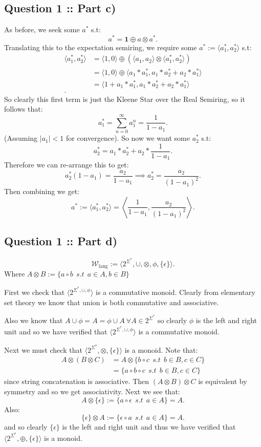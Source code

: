 \documentclass[a4paper]{article}
\begin{document}
\subsection*{Question 1 :: Part c)}
As before, we seek some $a^*$ s.t:
\[
a^* = \bm{1} \oplus a \otimes a^*
.\]
Translating this to the expectation semiring, we require some $a^* := \langle a_1^*, a_2^* \rangle$ s.t:
\begin{align*}
     \langle a_1^*, a_2^* \rangle &=  \langle 1, 0 \rangle \oplus (\langle a_1, a_2 \rangle \otimes \langle a_1^*, a_2^* \rangle)\\ 
 &=  \langle 1, 0 \rangle \oplus \langle a_1 * a_1^*, a_1 * a_2^* + a_2 * a_1^* \rangle\\ 
 &=  \langle 1 + a_1 * a_1^*, a_1 * a_2^* + a_2*a_1^* \rangle\\ 
.
\end{align*}
So clearly this first term is just the Kleene Star over the Real Semiring, so it follows that:
\[
a_1^* = \sum_{n=0}^{\infty} a_1^n = \frac{1}{1-a_1}
.\]
(Assuming $\left| a_1 \right|  < 1$ for convergence).
So now we want some $a_2^*$ s.t:
\[
a_2^* = a_1 * a_2^* + a_2 * \frac{1}{1-a_1}
.\]
Therefore we can re-arrange this to get:
\[
a_2^*(1-a_1) = \frac{a_2}{1-a_1}
 \implies a_2^* = \frac{a_2}{(1-a_1)^2}
.\]
Then combining we get:
\[
a^* := \langle a_1^*, a_2^* \rangle = \left\langle \frac{1}{1-a_1}, \frac{a_2}{(1-a_1)^2} \right\rangle
.\]


\subsection*{Question 1 :: Part d)}
\[
\mathcal{W}_{\text{lang}} := \langle 2^{\Sigma^*}, \cup, \otimes, \phi, \{\epsilon\}   \rangle
.\]
Where $A \otimes B := \{a \circ b ~~s.t~~ a\in A, b\in B\} $

First we check that $\langle 2^{\Sigma^*, \cup , \phi} \rangle$ is a commutative monoid.
Clearly from elementary set theory we know that union is both commutative and associative.

Also we know that $A \cup \phi = A = \phi \cup A ~\forall A \in 2^{\Sigma^*}$ so clearly $\phi$ is the left
and right unit and so we have verified that $\langle 2^{\Sigma^*, \cup , \phi} \rangle$ is a commutative monoid.

Next we must check that $\langle 2^{\Sigma^*}, \otimes, \{\epsilon\} \rangle$ is a monoid.
Note that:
\begin{align*}
         A \otimes (B \otimes C) &=  A \otimes \{b \circ c ~~s.t~~ b \in B, c \in C\} \\ 
    &=  \{a \circ b \circ c ~~s.t~~ b \in B, c\in C\}
\end{align*}
since string concatenation is associative.
Then $(A\otimes B) \otimes C$ is equivalent by symmetry and so we get associativity.
Next we see that:
\[
A \otimes \{\epsilon\} := \{a \circ \epsilon ~~s.t~~ a \in A\} = A
.\]
Also:
\[
\{\epsilon\} \otimes A := \{\epsilon \circ a ~~s.t~~ a \in A\} = A
.\]
and so clearly $\{\epsilon\} $ is the left and right unit and thus we have verified that
$\langle 2^{\Sigma^*}, \oplus, \{\epsilon\}  \rangle$ is a monoid.
\end{document}
